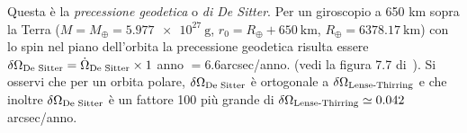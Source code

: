 Questa è la \emph{precessione geodetica} o \emph{di De Sitter}.  Per un
giroscopio a 650 km sopra la Terra ($M=M_{\oplus} = \SI{5.977e27}{\gram}$,
$r_0=R_{\oplus}+\SI{650}{\kilo\metre}$, $R_{\oplus}=\SI{6378.17}{\kilo\metre}$)
con lo spin nel piano dell'orbita la precessione geodetica risulta essere
$\delta \Omega_{\textup{De Sitter}} = {\dot{\Omega}_{\textup{De Sitter}}} \times
1$ anno $= 6.6$arcsec/anno.  (vedi la figura 7.7
di~\textcite[355]{ohanian:gravitazione}).  Si osservi che per un orbita polare,
$\delta \Omega_{\textup{De Sitter}}$ è ortogonale a $\delta
\Omega_{\textup{Lense-Thirring}}$ e che inoltre $\delta \Omega_{\textup{De
    Sitter}}$ è un fattore 100 più grande di $\delta
\Omega_{\textup{Lense-Thirring}} \simeq 0.042$ arcsec/anno.


